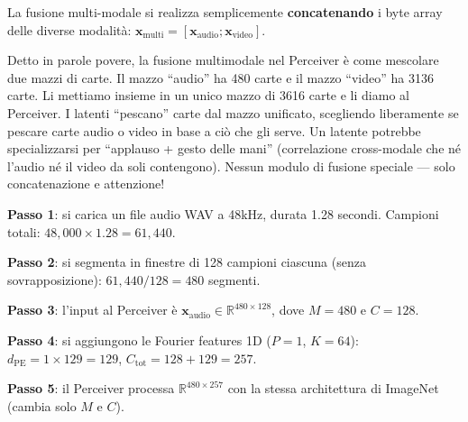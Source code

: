 \documentclass[12pt,a4paper]{article}
\begin{document}
La fusione multi-modale si realizza semplicemente \textbf{concatenando} i byte array delle diverse modalit\`a: $\mathbf{x}_{\text{multi}} = [\mathbf{x}_{\text{audio}}; \mathbf{x}_{\text{video}}]$.

\begin{notabox}
Detto in parole povere, la fusione multimodale nel Perceiver \`e come mescolare due mazzi di carte. Il mazzo ``audio'' ha 480 carte e il mazzo ``video'' ha 3136 carte. Li mettiamo insieme in un unico mazzo di 3616 carte e li diamo al Perceiver. I latenti ``pescano'' carte dal mazzo unificato, scegliendo liberamente se pescare carte audio o video in base a ci\`o che gli serve. Un latente potrebbe specializzarsi per ``applauso + gesto delle mani'' (correlazione cross-modale che n\'e l'audio n\'e il video da soli contengono). Nessun modulo di fusione speciale --- solo concatenazione e attenzione!
\end{notabox}

\begin{examplebox}
\textbf{Passo 1}: si carica un file audio WAV a 48kHz, durata 1.28 secondi. Campioni totali: $48{,}000 \times 1.28 = 61{,}440$.

\textbf{Passo 2}: si segmenta in finestre di 128 campioni ciascuna (senza sovrapposizione): $61{,}440 / 128 = 480$ segmenti.

\textbf{Passo 3}: l'input al Perceiver \`e $\mathbf{x}_{\text{audio}} \in \mathbb{R}^{480 \times 128}$, dove $M = 480$ e $C = 128$.

\textbf{Passo 4}: si aggiungono le Fourier features 1D ($P = 1$, $K = 64$): $d_{\text{PE}} = 1 \times 129 = 129$, $C_{\text{tot}} = 128 + 129 = 257$.

\textbf{Passo 5}: il Perceiver processa $\mathbb{R}^{480 \times 257}$ con la stessa architettura di ImageNet (cambia solo $M$ e $C$).
\end{examplebox}
\end{document}
